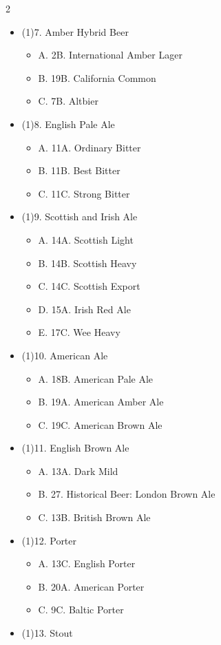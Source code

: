 \begin{multicols*}{2}
\begin{itemize}[noitemsep]
\item[] (1)7. Amber Hybrid Beer
\begin{itemize}
  \item[] A. 2B. International Amber Lager
  \item[] B. 19B. California Common
  \item[] C. 7B. Altbier
\end{itemize}
\item[] (1)8. English Pale Ale
\begin{itemize}
  \item[] A. 11A. Ordinary Bitter
  \item[] B. 11B. Best Bitter
  \item[] C. 11C. Strong Bitter
\end{itemize}
\item[] (1)9. Scottish and Irish Ale
\begin{itemize}
  \item[] A. 14A. Scottish Light
  \item[] B. 14B. Scottish Heavy
  \item[] C. 14C. Scottish Export
  \item[] D. 15A. Irish Red Ale
  \item[] E. 17C. Wee Heavy
\end{itemize}
\item[] (1)10. American Ale
\begin{itemize}
  \item[] A. 18B. American Pale Ale
  \item[] B. 19A. American Amber Ale
  \item[] C. 19C. American Brown Ale
\end{itemize}
\item[] (1)11. English Brown Ale
\begin{itemize}
  \item[] A. 13A. Dark Mild
  \item[] B. 27. Historical Beer: London Brown Ale
  \item[] C. 13B. British Brown Ale
\end{itemize}
\item[] (1)12. Porter
\begin{itemize}
  \item[] A. 13C. English Porter
  \item[] B. 20A. American Porter
  \item[] C. 9C. Baltic Porter
\end{itemize}
\item[] (1)13. Stout

\end{itemize}
\end{multicols*}
